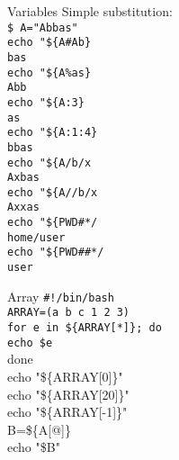 \documentclass{beamer}
\let\tt\texttt
\begin{document}
\begin{frame}{Variables}
        Simple substitution:                            \\
        \tt{\$ A="Abbas"}                               \\
        \tt{echo "\$\{A\#Ab\}}                          \\
        \tt{bas}                                        \\
        \tt{echo "\$\{A\%as\}}                          \\
        \tt{Abb}                                        \\
        \tt{echo "\$\{A:3\}}                            \\
        \tt{as}                                         \\
        \tt{echo "\$\{A:1:4\}}                          \\
        \tt{bbas}                                       \\
        \tt{echo "\$\{A/b/x}                            \\
        \tt{Axbas}                                      \\
        \tt{echo "\$\{A//b/x}                           \\
        \tt{Axxas}                                      \\
        \tt{echo "\$\{PWD\#*/}                          \\
        \tt{home/user}                                  \\
        \tt{echo "\$\{PWD\#\#*/}                        \\
        \tt{user}                                       \\
\end{frame}
\begin{frame}{Array}
        \tt{\#!/bin/bash}                       \\
        \tt{ARRAY=(a b c 1 2 3)}                \\
        \tt{for e in \$\{ARRAY[*]\}; do}        \\
        \quad \tt{echo \$e}                     \\
        done                                    \\
        echo "\$\{ARRAY[0]\}"                   \\
        echo "\$\{ARRAY[20]\}"                  \\
        echo "\$\{ARRAY[-1]\}"                  \\
        B=\$\{A[@]\}                            \\
        echo "\$B"
\end{frame}
\end{document}
